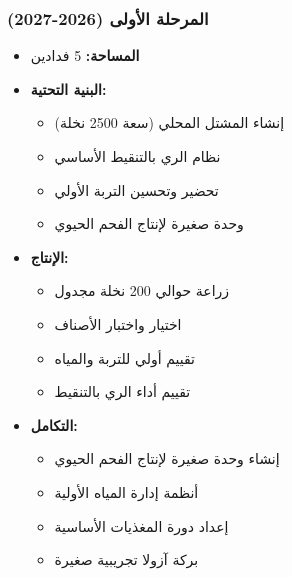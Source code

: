 \subsubsection{المرحلة الأولى (2026-2027)}
\begin{itemize}
    \item \textbf{المساحة:} 5 فدادين
    \item \textbf{البنية التحتية:}
    \begin{itemize}
        \item إنشاء المشتل المحلي (سعة 2500 نخلة)
        \item نظام الري بالتنقيط الأساسي
        \item تحضير وتحسين التربة الأولي
        \item وحدة صغيرة لإنتاج الفحم الحيوي
    \end{itemize}
    \item \textbf{الإنتاج:}
    \begin{itemize}
        \item زراعة حوالي 200 نخلة مجدول
        \item اختيار واختبار الأصناف
        \item تقييم أولي للتربة والمياه
        \item تقييم أداء الري بالتنقيط
    \end{itemize}
    \item \textbf{التكامل:}
    \begin{itemize}
        \item إنشاء وحدة صغيرة لإنتاج الفحم الحيوي
        \item أنظمة إدارة المياه الأولية
        \item إعداد دورة المغذيات الأساسية
        \item بركة آزولا تجريبية صغيرة
    \end{itemize}
\end{itemize}

